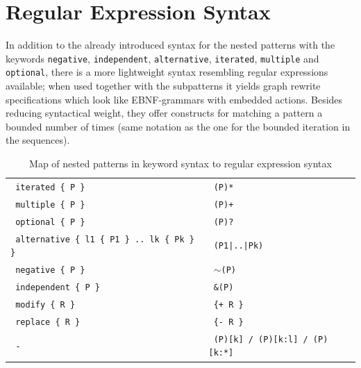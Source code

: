 \section{Regular Expression Syntax}

In addition to the already introduced syntax for the nested patterns with the keywords 
\texttt{negative}, \texttt{independent}, \texttt{alternative}, \texttt{iterated}, \texttt{multiple} and \texttt{optional},
there is a more lightweight syntax resembling regular expressions available; 
when used together with the subpatterns it yields graph rewrite specifications which look like EBNF-grammars with embedded actions. 
Besides reducing syntactical weight, they offer constructs for matching a pattern a bounded number of times (same notation as the one for the bounded iteration in the sequences).


\begin{table}[htbp]
  \centering
  \begin{tabularx}{\linewidth}{|l|X|} \hline
    \texttt{ iterated \{ P \} } & \texttt{ (P)* } \\
    \texttt{ multiple \{ P \} } & \texttt{ (P)+ } \\
    \texttt{ optional \{ P \} } & \texttt{ (P)? } \\ 
	\texttt{ alternative \{ l1 \{ P1 \} .. lk \{ Pk \} \} } & \texttt{ (P1|..|Pk) } \\
    \texttt{ negative \{ P \} } & \texttt{ $\sim$(P) } \\
    \texttt{ independent \{ P \} } & \texttt{ \&(P)} \\ \hline 
    \texttt{ modify \{ R \} } & \texttt{  \{+ R \} } \\
    \texttt{ replace \{ R \} } & \texttt{ \{- R \} } \\ \hline 
    \texttt{ - } & \texttt{ (P)[k] / (P)[k:l] / (P)[k:*] } \\ \hline 
	\end{tabularx}
  \caption{Map of nested patterns in keyword syntax to regular expression syntax}
  \label{keywordregexpsyntax}
\end{table}

